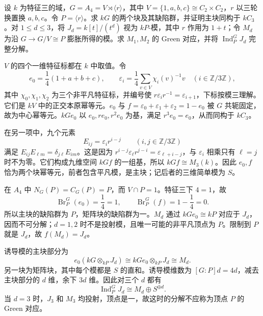 \begin{optionalexercise}\label{b5:ex:08-a4-green-correspondence}
	设 \(k\) 为特征三的域，\(G=A_4=V\rtimes\langle r\rangle\)，其中 \(V=\{1,a,b,c\}\cong C_2\times C_2\)，\(r\) 以三轮换置换 \(a,b,c\)。令 \(P=\langle r\rangle\)。求 \(kG\) 的两个块及其缺陷群，并证明主块同构于 \(kC_3\)。对 \(1\le d\le3\)，将 \(J_d=k[t]/(t^d)\) 视为 \(kP\)-模，其中 \(r\) 作用为 \(1+t\)；令 \(M_d\) 为沿 \(G\to G/V\cong P\) 膨胀所得的模。求 \(M_1,M_2\) 的 Green 对应，并将 \(\operatorname{Ind}_P^GJ_d\) 完整分解。
\end{optionalexercise}
\begin{solution}
	\(V\) 的四个一维特征标都在 \(k\) 中取值。令
	\[
		e_0=\frac14(1+a+b+c),\qquad
		\varepsilon_i=\frac14\sum_{v\in V}\chi_i(v)^{-1}v\quad(i\in\mathbb Z/3\mathbb Z),
	\]
	其中 \(\chi_0,\chi_1,\chi_2\) 为三个非平凡特征标，并编号使 \(r\varepsilon_ir^{-1}=\varepsilon_{i+1}\)，下标按模三理解。它们是 \(kV\) 中的正交本原幂等元。\(e_0\) 与 \(f=\varepsilon_0+\varepsilon_1+\varepsilon_2=1-e_0\) 被 \(G\) 共轭固定，故为中心幂等元。\(kGe_0\) 以 \(e_0,re_0,r^2e_0\) 为基，满足 \(r^3e_0=e_0\)，从而同构于 \(kC_3\)。

	在另一项中，九个元素
	\[
		E_{ij}=\varepsilon_i r^{i-j}\qquad(i,j\in\mathbb Z/3\mathbb Z)
	\]
	满足 \(E_{ij}E_{\ell m}=\delta_{j\ell}E_{im}\)。这是因为 \(r^{i-j}\varepsilon_\ell r^{j-i}=\varepsilon_{\ell+i-j}\)，与 \(\varepsilon_i\) 相乘只有 \(\ell=j\) 时不为零。它们构成九维空间 \(kGf\) 的一组基，所以 \(kGf\cong M_3(k)\)。因此 \(e_0,f\) 恰为两个块幂等元，前者包含平凡模，是主块；记后者的三维简单模为 \(S\)。

	在 \(A_4\) 中 \(N_G(P)=C_G(P)=P\)，而 \(V\cap P=1\)。特征三下 \(4=1\)，故
	\[
		\operatorname{Br}_P^G(e_0)=\frac14=1,\qquad
		\operatorname{Br}_P^G(f)=1-\frac14=0.
	\]
	所以主块的缺陷群为 \(P\)，矩阵块的缺陷群为一。\(M_d\) 通过 \(kGe_0\cong kP\) 对应于 \(J_d\)，因而不可分解；\(d=1,2\) 时不是投射模，且唯一可能的非平凡顶点为 \(P\)。限制到 \(P\) 就是 \(J_d\)，故 \(f(M_d)=J_d\)。

	诱导模的主块部分为
	\[
		e_0(kG\otimes_{kP}J_d)
		\cong kGe_0\otimes_{kP}J_d\cong M_d.
	\]
	另一块为矩阵块，其中每个模都是 \(S\) 的直和。诱导模维数为 \([G:P]d=4d\)，减去主块部分的 \(d\) 维，余下 \(3d\) 维。因此对三个 \(d\) 都有
	\[
		\operatorname{Ind}_P^GJ_d\cong M_d\oplus S^{\oplus d}.
	\]
	当 \(d=3\) 时，\(J_3\) 和 \(M_3\) 均投射，顶点是一，故这时的分解不应称为顶点 \(P\) 的 Green 对应。
\end{solution}

